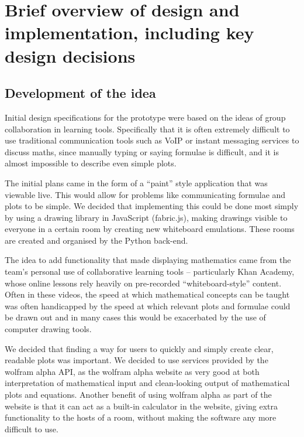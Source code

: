 \chapter{Brief overview of design and implementation, including key design decisions}\label{ch:design}\vspace{-10mm}

\section{Development of the idea}

Initial design specifications for the prototype were based on the ideas of group collaboration in learning tools. Specifically that it is often extremely difficult to use traditional communication tools such as VoIP or instant messaging services to discuss maths, since manually typing or saying formulae is difficult, and it is almost impossible to describe even simple plots.

The initial plans came in the form of a “paint” style application that was viewable live. This would allow for problems like communicating formulae and plots to be simple. We decided that implementing this could be done most simply by using a drawing library in JavaScript (fabric.js), making drawings visible to everyone in a certain room by creating new whiteboard emulations. These rooms are created and organised by the Python back-end.

The idea to add functionality that made displaying mathematics came from the team’s personal use of collaborative learning tools – particularly Khan Academy, whose online lessons rely heavily on pre-recorded “whiteboard-style” content. Often in these videos, the speed at which mathematical concepts can be taught was often handicapped by the speed at which relevant plots and formulae could be drawn out and in many cases this would be exacerbated by the use of computer drawing tools. 

We decided that finding a way for users to quickly and simply create clear, readable plots was important. We decided to use services provided by the wolfram alpha API, as the wolfram alpha website as very good at both interpretation of mathematical input and clean-looking output of mathematical plots and equations. Another benefit of using wolfram alpha as part of the website is that it can act as a built-in calculator in the website, giving extra functionality to the hosts of a room, without making the software any more difficult to use.

